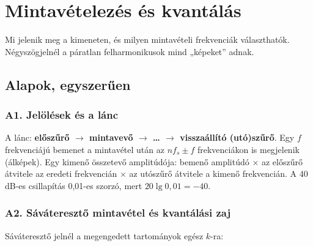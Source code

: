 \setcounter{chapter}{3}
\chapter{\texorpdfstring{Mintavételezés és kvantálás}{Mintavételezés és kvantálás}}\label{f4}
Mi jelenik meg a kimeneten, és milyen mintavételi frekvenciák választhatók. Négyszögjelnél a páratlan felharmonikusok mind „képeket” adnak.

\section{Alapok, egyszerűen}
\subsection{\texorpdfstring{A1. Jelölések és a lánc}{A1. Jelölések és a lánc}}\label{b4-jel}
\par{}\par

A lánc: \textbf{előszűrő $\to$ mintavevő $\to$ \ldots{} $\to$ visszaállító (utó)szűrő}. Egy $f$ frekvenciájú bemenet a mintavétel után az $nf_s\pm f$ frekvenciákon is megjelenik (álképek). Egy kimenő összetevő amplitúdója: bemenő amplitúdó $\times$ az előszűrő átvitele az eredeti frekvencián $\times$ az utószűrő átvitele a kimenő frekvencián. A 40 dB-es csillapítás 0,01-es szorzó, mert $20\lg0{,}01=-40$.

\subsection{\texorpdfstring{A2. Sáváteresztő mintavétel és kvantálási zaj}{A2. Sáváteresztő mintavétel és kvantálási zaj}}\label{b4-kepl}
Sáváteresztő jelnél a megengedett tartományok egész $k$-ra:


